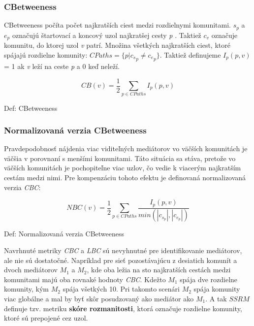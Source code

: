 \documentclass[slovak,master,public,dept460,male,cpdeclaration,oneside]{diploma}
\begin{document}
\subsubsection{CBetweeness}
\begin{sloppypar}
CBetweeness počíta počet najkratších ciest medzi rozdielnymi komunitami. \textit{${s_p}$} a \textit{${e_p}$} označujú štartovací a koncový uzol najkratšej cesty \textit{p} . Taktiež \textit{${c_v}$} označuje komunitu, do ktorej uzol \textit{v} patrí. Množina všetkých najkratších ciest, ktoré spájajú rozdielne komunity:  
\textit{${CPaths = \{ p | {c_s}_p \neq {c_e}_p} \}$}. Taktiež definujeme ${I_p(p, v)}$ = 1 ak \textit{v} leží na ceste \textit{p} a 0 keď neleží.


\begin{mycapequ}[!ht]
   \begin{equation*}
    CB(v) = \frac{1}{2} \sum_{p \in CPaths} I_{p}(p, v)
   \end{equation*}
   \caption{Def: CBetweeness}
\end{mycapequ}


\subsubsection{Normalizovaná verzia CBetweeness}
Pravdepodobnosť nájdenia viac viditeľných mediátorov vo väčších komunitách je väčšia v porovnaní s menšími komunitami. Táto situácia sa stáva, pretože vo väčších komunitách je pochopiteľne viac uzlov, čo vedie k viacerým najkratším cestám medzi nimi. Pre kompenzáciu tohoto efektu je definovaná normalizovaná verzia \textit{CBC}: 


\begin{mycapequ}[!ht]
   \begin{equation*}
    NBC(v) = \frac{1}{2} \sum_{p \in CPaths} \frac{I_{p}(p, v)}{min(|c_{s_{p}}|,|c_{e_{p}}|)}
   \end{equation*}
   \caption{Def: Normalizovaná verzia CBetweeness}
\end{mycapequ}


\end{sloppypar}


\begin{sloppypar}
Navrhnuté metriky \textit{CBC} a \textit{LBC} sú nevyhnutné pre identifikovanie mediátorov, ale nie sú dostatočné. Napríklad pre sieť pozostávajúcu z desiatich komunít a dvoch mediátorov \textit{${M_1}$}
a \textit{${M_2}$}, kde oba ležia na sto najkratších cestách medzi komunitami majú oba rovnaké hodnoty \textit{CBC}. Kdežto \textit{${M_1}$} spája dve rozdielne komunity, kým \textit{${M_2}$} spája všetkých 10. Pri takomto scenári \textit{${M_2}$} spája komunity viac globálne a mal by byť skôr posudzovaný ako mediátor ako \textit{${M_1}$}. A tak \textit{${SSRM}$} definuje tzv. metriku \textbf{skóre rozmanitosti}, ktorá označuje rozdielne komunity, ktoré sú prepojené cez uzol.
\end{sloppypar}
\end{document}
